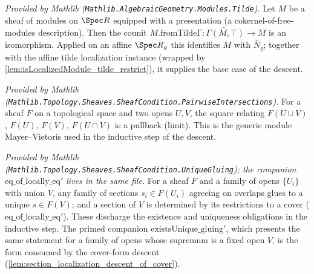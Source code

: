 \begin{lemma}
  \label{lem:isIso_fromTildeΓ_of_presentation_mathlib}
  \mathlibok
  \textit{Provided by Mathlib (\texttt{Mathlib.AlgebraicGeometry.Modules.Tilde}).}
  Let \(M\) be a sheaf of modules on \(\Spec R\) equipped with a presentation (a
  cokernel-of-free-modules description). Then the counit
  \(M.\mathrm{fromTildeΓ} : \widetilde{\Gamma(M,\top)} \to M\) is an isomorphism. Applied on an
  affine \(\Spec R_g\) this identifies \(M\) with \(\widetilde{N_g}\); together with the affine
  tilde localization instance (wrapped by \cref{lem:isLocalizedModule_tilde_restrict}), it supplies
  the base case of the descent.
\end{lemma}

\begin{lemma}
  \label{lem:isLimitPullbackCone_mathlib}
  \mathlibok
  \textit{Provided by Mathlib
  (\texttt{Mathlib.Topology.Sheaves.SheafCondition.PairwiseIntersections}).}
  For a sheaf \(F\) on a topological space and two opens \(U, V\), the square relating
  \(F(U \cup V)\), \(F(U)\), \(F(V)\), \(F(U \cap V)\) is a pullback (limit). This is the generic
  module Mayer--Vietoris used in the inductive step of the descent.
\end{lemma}

\begin{lemma}
  \label{lem:existsUnique_gluing_mathlib}
  \mathlibok
  \textit{Provided by Mathlib
  (\texttt{Mathlib.Topology.Sheaves.SheafCondition.UniqueGluing}); the companion
  \(\mathrm{eq\_of\_locally\_eq'}\) lives in the same file.}
  For a sheaf \(F\) and a family of opens \(\{U_i\}\) with union \(V\), any family of sections
  \(s_i \in F(U_i)\) agreeing on overlaps glues to a unique \(s \in F(V)\); and a section of \(V\)
  is determined by its restrictions to a cover (\(\mathrm{eq\_of\_locally\_eq'}\)). These discharge
  the existence and uniqueness obligations in the inductive step. The primed companion
  \(\mathrm{existsUnique\_gluing'}\), which presents the same statement for a family of opens whose
  supremum is a fixed open \(V\), is the form consumed by the cover-form descent
  (\cref{lem:section_localization_descent_of_cover}).
\end{lemma}

